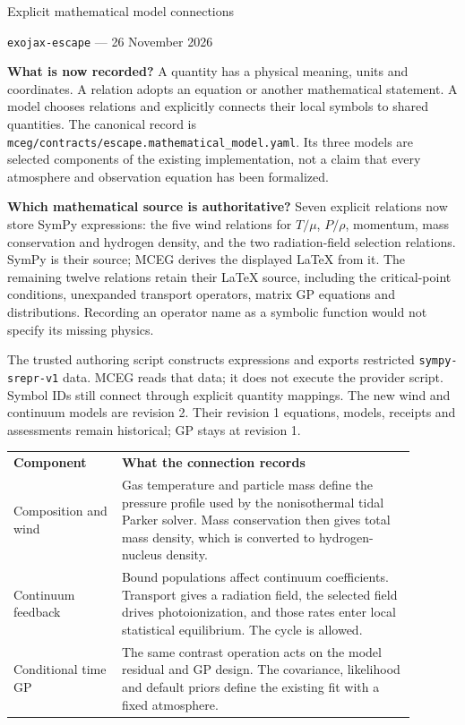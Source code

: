 \documentclass[10pt,a4paper]{article}
\begin{document}
\begin{center}
{\Large Explicit mathematical model connections}\par\vspace{4pt}
\texttt{exojax-escape} --- 26 November 2026
\end{center}

\textbf{What is now recorded?}
A quantity has a physical meaning, units and coordinates. A relation adopts
an equation or another mathematical statement. A model chooses relations
and explicitly connects their local symbols to shared quantities. The
canonical record is
\texttt{mceg/contracts/escape.mathematical\_model.yaml}.
Its three models are selected components of the existing implementation,
not a claim that every atmosphere and observation equation has been formalized.

\textbf{Which mathematical source is authoritative?}
Seven explicit relations now store SymPy expressions: the five wind relations
for $T/\mu$, $P/\rho$, momentum, mass conservation and hydrogen density, and the
two radiation-field selection relations. SymPy is their source; MCEG derives
the displayed LaTeX from it. The remaining twelve relations retain their LaTeX
source, including the critical-point conditions, unexpanded transport
operators, matrix GP equations and distributions. Recording an operator name
as a symbolic function would not specify its missing physics.

The trusted authoring script constructs expressions and exports restricted
\texttt{sympy-srepr-v1} data. MCEG reads that data; it does not execute the
provider script. Symbol IDs still connect through explicit quantity mappings.
The new wind and continuum models are revision 2. Their revision 1 equations,
models, receipts and assessments remain historical; GP stays at revision 1.

\begin{center}
\begin{tabular}{p{0.24\linewidth}p{0.65\linewidth}}
\textbf{Component} & \textbf{What the connection records}\\[4pt]
Composition and wind & Gas temperature and particle mass define the pressure
profile used by the nonisothermal tidal Parker solver. Mass conservation
then gives total mass density, which is converted to hydrogen-nucleus
density.\\[5pt]
Continuum feedback & Bound populations affect continuum coefficients.
Transport gives a radiation field, the selected field drives photoionization,
and those rates enter local statistical equilibrium. The cycle is allowed.\\[5pt]
Conditional time GP & The same contrast operation acts on the model residual
and GP design. The covariance, likelihood and default priors define the
existing fit with a fixed atmosphere.\\
\end{tabular}
\end{center}
\end{document}
